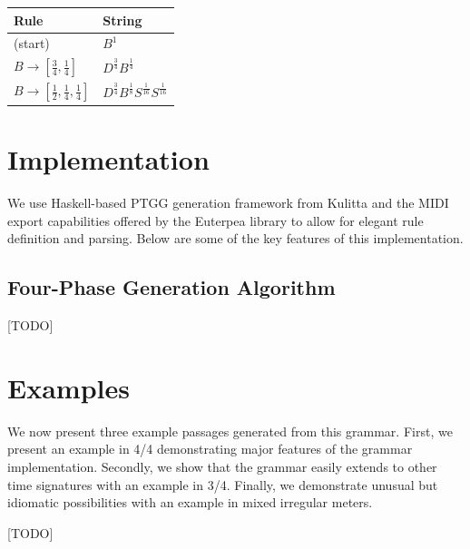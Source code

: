 \documentclass{article}
\begin{document}
\bgroup
\def\arraystretch{1.5}
\begin{center}
\begin{tabular}{ l l }
 Rule & String \\
 \hline
 (start)                                                  & $B^{1}$ \\
 $B \rightarrow [\frac{3}{4}, \frac{1}{4}]$               & $D^{\frac{3}{4}} B^{\frac{1}{4}}$ \\
 $B \rightarrow [\frac{1}{2}, \frac{1}{4}, \frac{1}{4}]$  & $D^{\frac{3}{4}} B^{\frac{1}{8}} S^{\frac{1}{16}} S^{\frac{1}{16}}$ \\
\end{tabular}
\end{center}
\egroup


\section{Implementation}

We use Haskell-based PTGG generation framework from Kulitta and the MIDI export capabilities offered by the Euterpea library \cite{euterpea} to allow for elegant rule definition and parsing. Below are some of the key features of this implementation.

\subsection{Four-Phase Generation Algorithm}

[TODO]


\section{Examples}

We now present three example passages generated from this grammar. First, we present an example in 4/4 demonstrating major features of the grammar implementation. Secondly, we show that the grammar easily extends to other time signatures with an example in 3/4. Finally, we demonstrate unusual but idiomatic possibilities with an example in mixed irregular meters.

[TODO]

\end{document}
